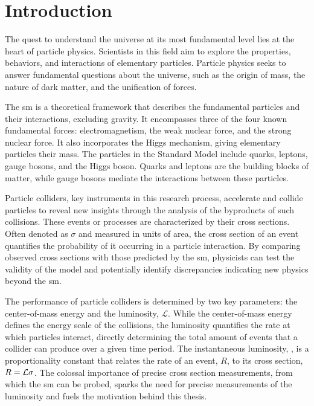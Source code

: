 \chapter{Introduction}


The quest to understand the universe at its most fundamental level lies at the heart of particle physics. Scientists in this field aim to explore the properties, behaviors, and interactions of elementary particles. Particle physics seeks to answer fundamental questions about the universe, such as the origin of mass, the nature of dark matter, and the unification of forces.

The \acrfull{sm} is a theoretical framework that describes the fundamental particles and their interactions, excluding gravity. It encompasses three of the four known fundamental forces: electromagnetism, the weak nuclear force, and the strong nuclear force. It also incorporates the Higgs mechanism, giving elementary particles their mass. The particles in the Standard Model include quarks, leptons, gauge bosons, and the Higgs boson. Quarks and leptons are the building blocks of matter, while gauge bosons mediate the interactions between these particles.

Particle colliders, key instruments in this research process, accelerate and collide particles to reveal new insights through the analysis of the byproducts of such collisions. These events or processes are characterized by their cross sections. Often denoted as $\sigma$ and measured in units of area, the cross section of an event quantifies the probability of it occurring in a particle interaction. By comparing observed cross sections with those predicted by the \acrshort{sm}, physicists can test the validity of the model and potentially identify discrepancies indicating new physics beyond the \acrshort{sm}.

The performance of particle colliders is determined by two key parameters: the center-of-mass energy and the luminosity, $\mathcal{L}$. While the center-of-mass energy defines the energy scale of the collisions, the luminosity quantifies the rate at which particles interact, directly determining the total amount of events that a collider can produce over a given time period. The instantaneous luminosity, \ilum, is a proportionality constant that relates the rate of an event, $R$, to its cross section, $R = \mathcal{L} \sigma$. The colossal importance of precise cross section measurements, from which the \acrshort{sm} can be probed, sparks the need for precise measurements of the luminosity and fuels the motivation behind this thesis.


